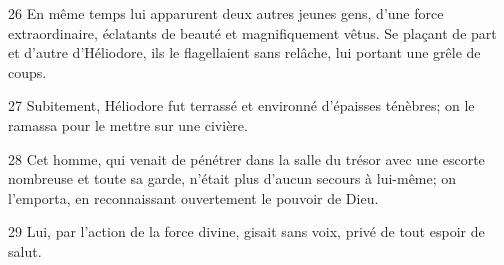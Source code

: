 
26 En même temps lui apparurent deux autres jeunes gens, d’une force extraordinaire, éclatants de beauté et magnifiquement vêtus. Se plaçant de part et d’autre d’Héliodore, ils le flagellaient sans relâche, lui portant une grêle de coups.

27 Subitement, Héliodore fut terrassé et environné d’épaisses ténèbres; on le ramassa pour le mettre sur une civière.

28 Cet homme, qui venait de pénétrer dans la salle du trésor avec une escorte nombreuse et toute sa garde, n’était plus d’aucun secours à lui-même; on l’emporta, en reconnaissant ouvertement le pouvoir de Dieu.

29 Lui, par l’action de la force divine, gisait sans voix, privé de tout espoir de salut.